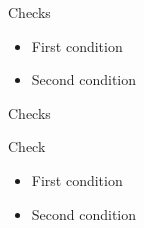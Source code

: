 \documentclass{beamer}
\begin{document}
\begin{frame}{Checks}
\begin{tcolorbox}[colback=blue!5!white,colframe=blue!75!black,title=Check]
\begin{itemize}
\item First condition
\item Second condition
\end{itemize}
\end{tcolorbox}
\end{frame}

\begin{frame}{Checks}
\begin{block}{Check}
\begin{itemize}
\item First condition
\item Second condition
\end{itemize}
\end{block}
\end{frame}
\end{document}
